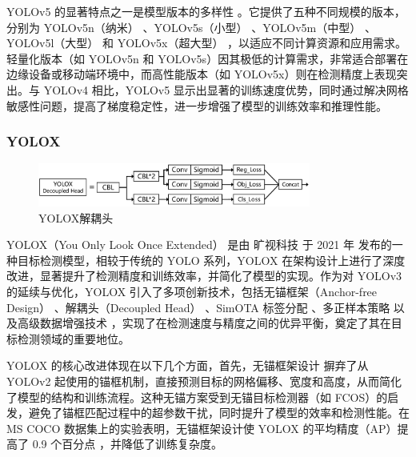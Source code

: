 \documentclass[11pt,twocolumn]{ctexart}
\begin{document}
YOLOv5 的显著特点之一是模型版本的多样性 。它提供了五种不同规模的版本，分别为 YOLOv5n（纳米） 、YOLOv5s（小型） 、YOLOv5m（中型） 、YOLOv5l（大型） 和 YOLOv5x（超大型） ，以适应不同计算资源和应用需求。轻量化版本（如 YOLOv5n 和 YOLOv5s）因其极低的计算需求，非常适合部署在边缘设备或移动端环境中，而高性能版本（如 YOLOv5x）则在检测精度上表现突出。与 YOLOv4 相比，YOLOv5 显示出显著的训练速度优势，同时通过解决网格敏感性问题，提高了梯度稳定性，进一步增强了模型的训练效率和推理性能。

\subsubsection{YOLOX}

\begin{figure}[!hbtp]
  \begin{center}
  \includegraphics[width=0.8\textwidth]{YOLOX解耦头}
    \end{center}
  \caption{YOLOX解耦头}
  \label{YOLOX解耦头}
\end{figure}

YOLOX（You Only Look Once Extended）\cite{ge2021yolox} 是由 旷视科技 于 2021 年 发布的一种目标检测模型，相较于传统的 YOLO 系列，YOLOX 在架构设计上进行了深度改进，显著提升了检测精度和训练效率，并简化了模型的实现。作为对 YOLOv3 的延续与优化，YOLOX 引入了多项创新技术，包括无锚框架（Anchor-free Design） 、解耦头（Decoupled Head） 、SimOTA 标签分配 、多正样本策略 以及高级数据增强技术 ，实现了在检测速度与精度之间的优异平衡，奠定了其在目标检测领域的重要地位。

YOLOX 的核心改进体现在以下几个方面，首先，无锚框架设计 摒弃了从 YOLOv2 起使用的锚框机制，直接预测目标的网格偏移、宽度和高度，从而简化了模型的结构和训练流程。这种无锚方案受到无锚目标检测器（如 FCOS）的启发，避免了锚框匹配过程中的超参数干扰，同时提升了模型的效率和检测性能。在 MS COCO 数据集上的实验表明，无锚框架设计使 YOLOX 的平均精度（AP）提高了 0.9 个百分点 ，并降低了训练复杂度。
\end{document}
